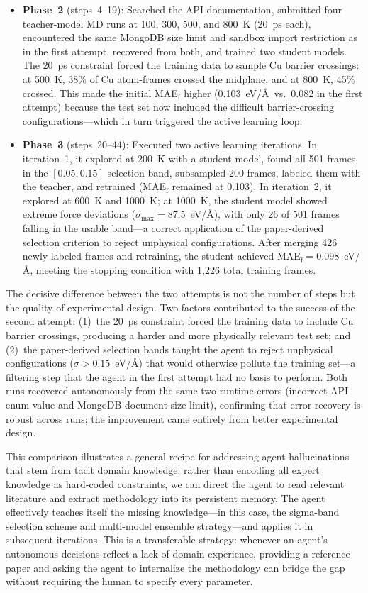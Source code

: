 \documentclass{article}
\begin{document}
\begin{itemize}
\item \textbf{Phase~2} (steps~4--19): Searched the API documentation, submitted four teacher-model MD runs at 100, 300, 500, and 800~K (20~ps each), encountered the same MongoDB size limit and sandbox import restriction as in the first attempt, recovered from both, and trained two student models.
The 20~ps constraint forced the training data to sample Cu barrier crossings: at 500~K, 38\% of Cu atom-frames crossed the midplane, and at 800~K, 45\% crossed.
This made the initial MAE$_\mathrm{f}$ higher (0.103~eV/\AA\ vs.\ 0.082 in the first attempt) because the test set now included the difficult barrier-crossing configurations---which in turn triggered the active learning loop.

\item \textbf{Phase~3} (steps~20--44): Executed two active learning iterations.
In iteration~1, it explored at 200~K with a student model, found all 501 frames in the $[0.05, 0.15]$ selection band, subsampled 200 frames, labeled them with the teacher, and retrained (MAE$_\mathrm{f}$ remained at 0.103).
In iteration~2, it explored at 600~K and 1000~K; at 1000~K, the student model showed extreme force deviations ($\sigma_\mathrm{max} = 87.5$~eV/\AA), with only 26 of 501 frames falling in the usable band---a correct application of the paper-derived selection criterion to reject unphysical configurations.
After merging 426 newly labeled frames and retraining, the student achieved MAE$_\mathrm{f} = 0.098$~eV/\AA, meeting the stopping condition with 1{,}226 total training frames.
\end{itemize}

The decisive difference between the two attempts is not the number of steps but the quality of experimental design.
Two factors contributed to the success of the second attempt: (1)~the 20~ps constraint forced the training data to include Cu barrier crossings, producing a harder and more physically relevant test set; and (2)~the paper-derived selection bands taught the agent to reject unphysical configurations ($\sigma > 0.15$~eV/\AA) that would otherwise pollute the training set---a filtering step that the agent in the first attempt had no basis to perform.
Both runs recovered autonomously from the same two runtime errors (incorrect API enum value and MongoDB document-size limit), confirming that error recovery is robust across runs; the improvement came entirely from better experimental design.

This comparison illustrates a general recipe for addressing agent hallucinations that stem from tacit domain knowledge: rather than encoding all expert knowledge as hard-coded constraints, we can direct the agent to read relevant literature and extract methodology into its persistent memory.
The agent effectively teaches itself the missing knowledge---in this case, the sigma-band selection scheme and multi-model ensemble strategy---and applies it in subsequent iterations.
This is a transferable strategy: whenever an agent's autonomous decisions reflect a lack of domain experience, providing a reference paper and asking the agent to internalize the methodology can bridge the gap without requiring the human to specify every parameter.
\end{document}
